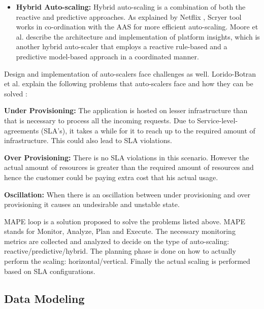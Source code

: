 \documentclass[article,type=msc,colorback,12pt,accentcolor=tud8b,table]{tudthesis}
\begin{document}
\begin{itemize}
\item{\textbf{Hybrid Auto-scaling: }} Hybrid auto-scaling is a combination of both the reactive and predictive approaches. As explained by Netflix \cite{Scryer1}, Scryer tool works in co-ordination with the AAS for more efficient auto-scaling. Moore et al.\cite{moore2013coordinated} describe the architecture and implementation of platform insights, which is another hybrid auto-scaler that employs a reactive rule-based and a predictive model-based approach in a coordinated manner.
\end{itemize}
Design and implementation of auto-scalers face challenges as well. Lorido-Botran et al. explain the following problems that auto-scalers face and how they can be solved \cite{lorido2014review}:
\begin{description}
	\item{\textbf{Under Provisioning:}} The application is hosted on lesser infrastructure than that is necessary to process all the incoming requests. Due to Service-level-agreements (SLA's), it takes a while for it to reach up to the required amount of infrastructure. This could also lead to SLA violations.
	
	\item{\textbf{Over Provisioning:}} There is no SLA violations in this scenario. However the actual amount of resources is greater than the required amount of resources and hence the customer could be paying extra cost that his actual usage.
	
	\item{\textbf{Oscillation:}}
		When there is an oscillation between under provisioning and over provisioning it causes an undesirable and unstable state. 
\end{description}

MAPE loop is a solution proposed to solve the problems listed above\cite{lorido2014review}. MAPE stands for Monitor, Analyze, Plan and Execute. The necessary monitoring metrics are collected and analyzed to decide on the type of auto-scaling: reactive/predictive/hybrid. The planning phase is done on how to actually perform the scaling: horizontal/vertical. Finally the actual scaling is performed based on SLA configurations.

	\subsection{Data Modeling}
	
\end{document}

